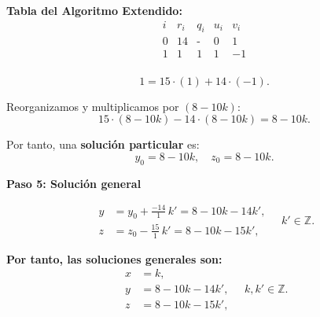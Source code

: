 \documentclass[a4paper,12pt]{article}
\begin{document}
\begin{ejemplo}[title={Ecuación diofántica con 3 incógnitas (Primer caso)}]

\textbf{Tabla del Algoritmo Extendido:}
\[
\begin{array}{c|c|c|c|c}
i & r_i & q_i & u_i & v_i \\
\hline
0 & 14 & \text{-} & 0 & 1 \\
1 & \boxed{1} & 1 & 1 & -1 \\
\end{array}
\]

\[
\boxed{1} = 15 \cdot (1) + 14 \cdot (-1).
\]

\bigskip

Reorganizamos y multiplicamos por \((8 - 10k)\):
\[
15 \cdot (8 - 10k) - 14 \cdot (8 - 10k) = 8 - 10k.
\]

Por tanto, una \textbf{solución particular} es:
\[
y_0 = 8 - 10k, \quad z_0 = 8 - 10k.
\]

\bigskip

\textbf{Paso 5: Solución general}

\[
\begin{aligned}
y &= y_0 + \frac{-14}{1} \, k' = 8 - 10k - 14k', \\
z &= z_0 - \frac{15}{1} \, k' = 8 - 10k - 15k',
\end{aligned}
\quad k' \in \mathbb{Z}.
\]

\bigskip

\textbf{Por tanto, las soluciones generales son:}
\[
\boxed{
\begin{aligned}
x &= k,\\
y &= 8 - 10k - 14k',\\
z &= 8 - 10k - 15k',
\end{aligned}
\quad k, k' \in \mathbb{Z}.
}
\]
\end{ejemplo}
\end{document}
